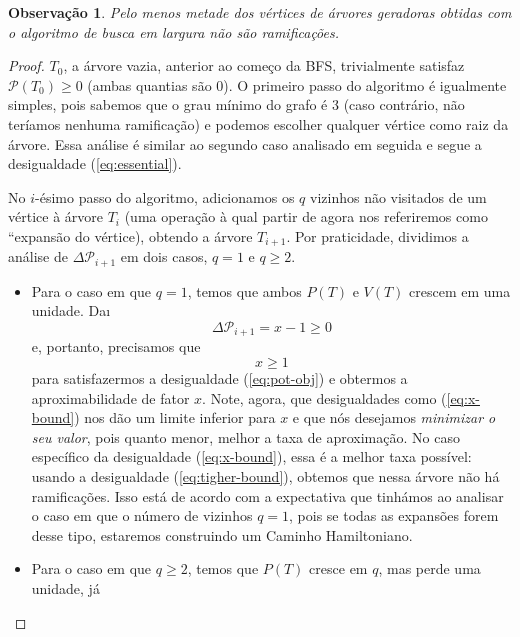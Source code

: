 \documentclass[conference]{IEEEtran}
\newtheorem{obs}{Observa\c{c}\~ao}[section]
\begin{document}
\begin{obs}
  Pelo menos metade dos v\'ertices de \'arvores geradoras obtidas com o algoritmo de busca em largura
  n\~ao s\~ao ramifica\c{c}\~oes.
\end{obs}
\begin{proof}
  $T_0$, a \'arvore vazia, anterior ao come\c{c}o da BFS, trivialmente satisfaz
  $\mathcal{P}(T_0) \ge 0$ (ambas quantias s\~ao 0). O primeiro passo do algoritmo \'e igualmente
  simples, pois sabemos que o grau m\'inimo do grafo \'e 3 (caso contr\'ario, n\~ao ter\'iamos
  nenhuma ramifica\c{c}\~ao) e podemos escolher qualquer v\'ertice como raiz da \'arvore.
  Essa an\'alise \'e similar ao segundo caso analisado em seguida e segue a desigualdade
  (\ref{eq:essential}).

  No $i$-\'esimo passo do algoritmo, adicionamos os $q$ vizinhos n\~ao visitados de um v\'ertice
  \`a \'arvore $T_i$ (uma opera\c{c}\~ao \`a qual partir de agora nos referiremos como
  ``expans\~ao do v\'ertice), obtendo a \'arvore $T_{i + 1}$. Por praticidade, dividimos a
  an\'alise de $\Delta \mathcal{P}_{i + 1}$ em dois casos, $q = 1$ e $q \ge 2$.
  \begin{itemize}
    \item Para o caso em que $q = 1$, temos que ambos $P(T)$ e $V(T)$ crescem em uma unidade. Da\i
      \begin{equation}
        \Delta \mathcal{P}_{i + 1} = x - 1 \ge 0
      \end{equation}
      e, portanto, precisamos que
      \begin{equation} \label{eq:x-bound}
        x \ge 1
      \end{equation}
      para satisfazermos a desigualdade (\ref{eq:pot-obj}) e obtermos a aproximabilidade de fator
      $x$. Note, agora, que desigualdades como (\ref{eq:x-bound}) nos d\~ao um limite inferior para
      $x$ e que n\'os desejamos \emph{minimizar o seu valor}, pois quanto menor, melhor a taxa de
      aproxima\c{c}\~ao. No caso espec\'ifico da desigualdade (\ref{eq:x-bound}), essa \'e a melhor
      taxa poss\'ivel: usando a desigualdade (\ref{eq:tigher-bound}), obtemos que nessa \'arvore
      n\~ao h\'a ramifica\c{c}\~oes. Isso est\'a de acordo com a expectativa que tinh\'amos ao
      analisar o caso em que o n\'umero de vizinhos $q = 1$, pois se todas as expans\~oes forem desse
      tipo, estaremos construindo um Caminho Hamiltoniano.
    \item Para o caso em que $q \ge 2$, temos que $P(T)$ cresce em $q$, mas perde uma unidade, j\'a

\end{itemize}
\end{proof}
\end{document}
